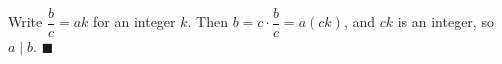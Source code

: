 Write $\dfrac bc=ak$ for an integer $k$. Then $b=c\cdot\dfrac bc=a(ck)$, and $ck$ is an integer, so $a\mid b$. $\blacksquare$
